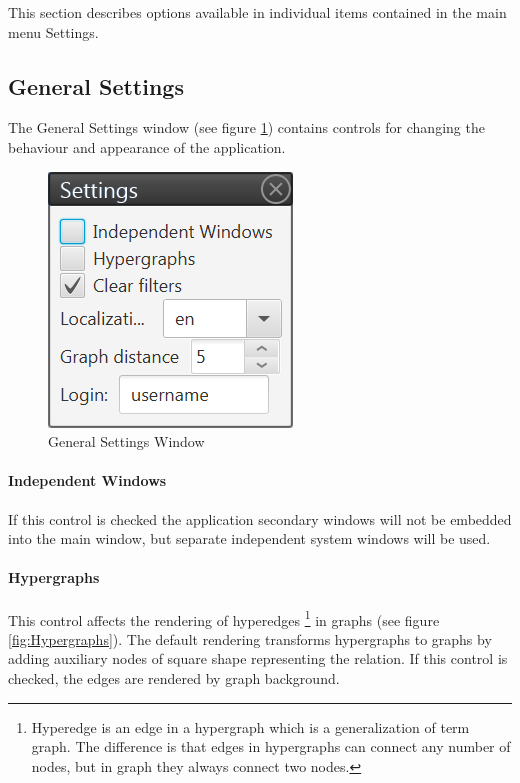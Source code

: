 \documentclass[12pt,a4paper]{report}
\begin{document}
This section describes options available in individual items contained in the
main menu Settings.

\subsection{General Settings}
\label{sssec:GeneralSettings}

The General Settings window (see figure \ref{fig:GeneralSettings}) contains
controls for changing the behaviour and appearance of the application.

\begin{figure}[!htb]
        \centering
        \includegraphics{Images/general}
        \caption{General Settings Window}
        \label{fig:GeneralSettings}
\end{figure}

\paragraph{Independent Windows} If this control is checked the application
secondary windows will not be embedded into the main window, but separate
independent system windows will be used.

\paragraph{Hypergraphs} This control affects the rendering of hyperedges%
\footnote{Hyperedge is an edge in a hypergraph which is a generalization of
term graph. The difference is that edges in hypergraphs can connect any number
of nodes, but in graph they always connect two nodes.}
in graphs (see figure \ref{fig:Hypergraphs}). The default rendering transforms
hypergraphs to graphs by adding auxiliary nodes of square shape representing
the relation. If this control is checked, the edges are rendered by graph
background.
\end{document}
